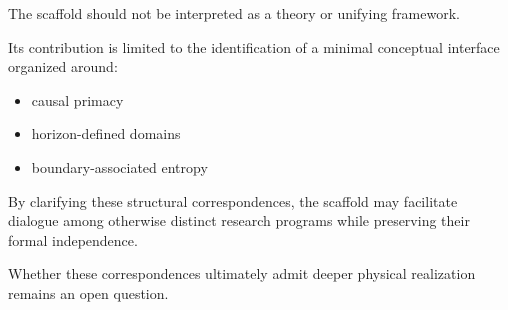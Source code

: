 \documentclass[12pt,a4paper]{article}
\begin{document}
The scaffold should not be interpreted as a theory or unifying framework.

Its contribution is limited to the identification of a minimal conceptual interface organized around:

\begin{itemize}
  \item causal primacy
  \item horizon-defined domains
  \item boundary-associated entropy
\end{itemize}

By clarifying these structural correspondences, the scaffold may facilitate dialogue among otherwise distinct research programs while preserving their formal independence.

Whether these correspondences ultimately admit deeper physical realization remains an open question.
\end{document}
